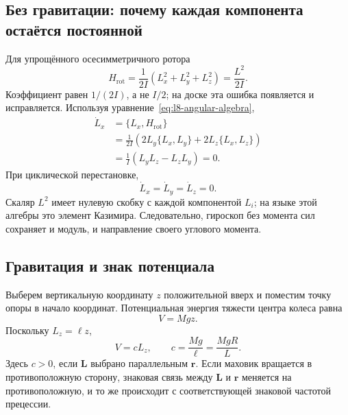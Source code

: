 \subsection{Без гравитации: почему каждая компонента остаётся постоянной}

Для упрощённого осесимметричного ротора
\begin{equation}
  H_{\mathrm{rot}}
  =\frac{1}{2I}
  \left(L_x^2+L_y^2+L_z^2\right)
  =\frac{L^2}{2I}.
  \label{eq:l8-rotational-hamiltonian}
\end{equation}
Коэффициент равен \(1/(2I)\), а не \(I/2\); на доске эта ошибка появляется и исправляется. Используя уравнение~\eqref{eq:l8-angular-algebra},
\begin{align}
  \dot L_x
  &=\{L_x,H_{\mathrm{rot}}\}\\
  &=\frac{1}{2I}\left(
    2L_y\{L_x,L_y\}
    +2L_z\{L_x,L_z\}
  \right)\\
  &=\frac{1}{I}\left(L_yL_z-L_zL_y\right)=0.
  \label{eq:l8-free-lx}
\end{align}
При циклической перестановке,
\begin{equation}
  \dot L_x=\dot L_y=\dot L_z=0.
  \label{eq:l8-free-angular-momentum}
\end{equation}
Скаляр \(L^2\) имеет нулевую скобку с каждой компонентой \(L_i\); на языке этой алгебры это элемент Казимира. Следовательно, гироскоп без момента сил сохраняет и модуль, и направление своего углового момента.

\begin{classroomqa}
\end{classroomqa}

\subsection{Гравитация и знак потенциала}

Выберем вертикальную координату \(z\) положительной вверх и поместим точку опоры в начало координат. Потенциальная энергия тяжести центра колеса равна
\begin{equation}
  V=Mgz.
  \label{eq:l8-mgz}
\end{equation}
Поскольку \(L_z=\ell z\),
\begin{equation}
  V=cL_z,
  \qquad
  c=\frac{Mg}{\ell}=\frac{MgR}{L}.
  \label{eq:l8-potential-lz}
\end{equation}
Здесь \(c>0\), если \(\boldsymbol L\) выбрано параллельным \(\boldsymbol r\). Если маховик вращается в противоположную сторону, знаковая связь между \(\boldsymbol L\) и \(\boldsymbol r\) меняется на противоположную, и то же происходит с соответствующей знаковой частотой прецессии.

